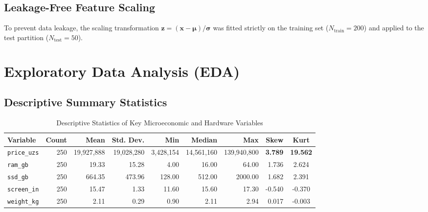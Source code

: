 \documentclass[11pt, a4paper]{article}
\begin{document}
\subsection{Leakage-Free Feature Scaling}
To prevent data leakage, the scaling transformation $\mathbf{z} = (\mathbf{x} - \boldsymbol{\mu}) / \boldsymbol{\sigma}$ was fitted strictly on the training set ($N_{\text{train}} = 200$) and applied to the test partition ($N_{\text{test}} = 50$).

\section{Exploratory Data Analysis (EDA)}

\subsection{Descriptive Summary Statistics}

\begin{table}[h!]
\centering
\caption{Descriptive Statistics of Key Microeconomic and Hardware Variables}
\vspace{0.2cm}
\small
\begin{tabular}{lrrrrrrrc}
\toprule
\textbf{Variable} & \textbf{Count} & \textbf{Mean} & \textbf{Std. Dev.} & \textbf{Min} & \textbf{Median} & \textbf{Max} & \textbf{Skew} & \textbf{Kurt} \\
\midrule
\texttt{price\_uzs} & 250 & 19,927,888 & 19,028,280 & 3,428,154 & 14,561,160 & 139,940,800 & \textbf{3.789} & \textbf{19.562} \\
\texttt{ram\_gb}    & 250 & 19.33 & 15.28 & 4.00 & 16.00 & 64.00 & 1.736 & 2.624 \\
\texttt{ssd\_gb}    & 250 & 664.35 & 473.96 & 128.00 & 512.00 & 2000.00 & 1.682 & 2.391 \\
\texttt{screen\_in} & 250 & 15.47 & 1.33 & 11.60 & 15.60 & 17.30 & -0.540 & -0.370 \\
\texttt{weight\_kg} & 250 & 2.11 & 0.29 & 0.90 & 2.11 & 2.94 & 0.017 & -0.003 \\
\bottomrule
\end{tabular}
\end{table}
\end{document}
